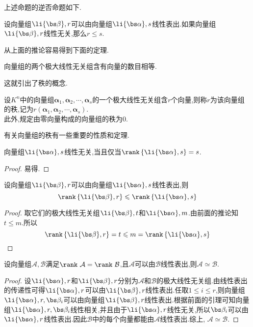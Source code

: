 \documentclass{ctexart}
\begin{document}
上述命题的逆否命题如下.
\begin{lemma}
    设向量组$\li{\bs\beta},r$可以由向量组$\li{\bs\alpha},s$线性表出.如果向量组$\li{\bs\beta},r$线性无关,那么$r\leqslant s$.
\end{lemma}
从上面的推论容易得到下面的定理.
\begin{theorem}
    向量组的两个极大线性无关组含有向量的数目相等.
\end{theorem}
这就引出了秩的概念.
\begin{definition}[秩]
    设$K^n$中的向量组$\boldsymbol{\alpha}_1,\boldsymbol{\alpha}_2,\cdots,\boldsymbol{\alpha}_s$的一个极大线性无关组含$r$个向量,则称$r$为该向量组的秩,记为$r(\boldsymbol{\alpha}_1,\boldsymbol{\alpha}_2,\cdots,\boldsymbol{\alpha}_s)$.\\
    此外,规定由零向量构成的向量组的秩为$0$.
\end{definition}
有关向量组的秩有一些重要的性质和定理.
\begin{theorem}
    向量组$\li{\bs\alpha},s$线性无关,当且仅当$\rank\left\{\li{\bs\alpha},s\right\}=s$.
\end{theorem}
\begin{proof}
    易得.
\end{proof}
\begin{theorem}
    设向量组$\li{\bs\beta},r$可以由向量组$\li{\bs\alpha},s$线性表出,则
    \[\rank\left\{\li{\bs\beta},r\right\}\leqslant\rank\left\{\li{\bs\alpha},s\right\}\]
\end{theorem}
\begin{proof}
    取它们的极大线性无关组$\li{\bs\beta},t$和$\li{\bs\alpha},m$.由前面的推论知$t\leqslant m$.所以
    \[\rank\left\{\li{\bs\beta},r\right\}= t\leqslant m=\rank\left\{\li{\bs\alpha},s\right\}\]
\end{proof}
\begin{theorem}
    设向量组$\mathcal{A},\mathcal{B}$满足$\rank\ \mathcal{A}=\rank\ \mathcal{B}$,且$\mathcal{A}$可以由$\mathcal{B}$线性表出,则$\mathcal{A}\simeq\mathcal{B}$.
\end{theorem}
\begin{proof}
    设$\li{\bs\alpha},r$和$\li{\bs\beta},r$分别为$\mathcal{A}$和$\mathcal{B}$的极大线性无关组.由线性表出的传递性可得$\li{\bs\alpha},r$可以由$\li{\bs\beta},r$线性表出.任取$1\leqslant i\leqslant r$,则向量组$\li{\bs\alpha},r,\bs\beta_i$可以由向量组$\li{\bs\beta},r$线性表出.根据前面的引理可知向量组$\li{\bs\alpha},r,\bs\beta_i$线性相关,并且由于$\li{\bs\alpha},r$线性无关,所以$\bs\beta_i$可以由$\li{\bs\alpha},r$线性表出.因此$\mathcal{B}$中的每个向量都能由$\mathcal{A}$线性表出.综上, $\mathcal{A}\simeq\mathcal{B}$.
\end{proof}
\end{document}
